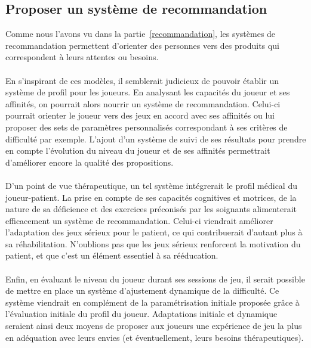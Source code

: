 	\subsection{Proposer un système de recommandation}
Comme nous l'avons vu dans la partie~\ref{recommandation}, les systèmes de recommandation permettent d'orienter des personnes vers des produits qui correspondent à leurs attentes ou besoins. 

\paragraph{} En s'inspirant de ces modèles, il semblerait judicieux de pouvoir établir un système de profil pour les joueurs. En analysant les capacités du joueur et ses affinités, on pourrait alors nourrir un système de recommandation. Celui-ci pourrait orienter le joueur vers des jeux en accord avec ses affinités ou lui proposer des sets de paramètres personnalisés correspondant à ses critères de difficulté par exemple. L'ajout d'un système de suivi de ses résultats pour prendre en compte l'évolution du niveau du joueur et de ses affinités permettrait d'améliorer encore la qualité des propositions.

\paragraph{} D'un point de vue thérapeutique, un tel système intégrerait le profil médical du joueur-patient. La prise en compte de ses capacités cognitives et motrices, de la nature de sa déficience et des exercices préconisés par les soignants alimenterait efficacement un système de recommandation. Celui-ci viendrait améliorer l'adaptation des jeux sérieux pour le patient, ce qui contribuerait d'autant plus à sa réhabilitation. N'oublions pas que les jeux sérieux renforcent la motivation du patient, et que c'est un élément essentiel à sa rééducation.

\paragraph{}
Enfin, en évaluant le niveau du joueur durant ses sessions de jeu, il serait possible de mettre en place un système d'ajustement dynamique de la difficulté. Ce système viendrait en complément de la paramétrisation initiale proposée grâce à l'évaluation initiale du profil du joueur. Adaptations initiale et dynamique seraient ainsi deux moyens de proposer aux joueurs une expérience de jeu la plus en adéquation avec leurs envies (et éventuellement, leurs besoins thérapeutiques).
	
